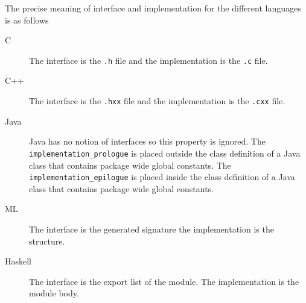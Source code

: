 The precise meaning of interface and implementation for the different
languages is as follows
\begin{description}
  \item[C]
    The interface is the \texttt{.h} file and the implementation is the \texttt{.c}
    file.
  \item[C++]
    The interface is the \texttt{.hxx} file and the implementation is the \texttt{.cxx}
    file.
  \item[Java]
     Java has no notion of interfaces so this property is ignored. The
     \lstinline!implementation_prologue! is placed outside the class definition of a
     Java class that contains package wide global constants. The
     \lstinline!implementation_epilogue! is placed inside the class definition of a Java
     class that contains package wide global constants. 
  \item[ML]
    The interface is the generated signature the implementation is the structure.
  \item[Haskell]
    The interface is the export list of the module. The implementation is the
    module body.  
\end{description}%


